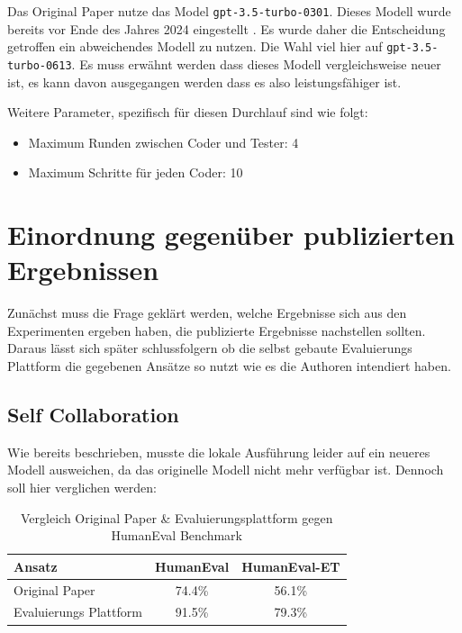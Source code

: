 Das Original Paper nutze das Model \texttt{gpt-3.5-turbo-0301}. Dieses Modell wurde bereits vor Ende des Jahres 2024 eingestellt \cite{DeprecationsOpenAIAPI}. Es wurde daher die Entscheidung getroffen ein abweichendes Modell zu nutzen. Die Wahl viel hier auf \texttt{gpt-3.5-turbo-0613}. Es muss erwähnt werden dass dieses Modell vergleichsweise neuer ist, es kann davon ausgegangen werden dass es also leistungsfähiger ist.

Weitere Parameter, spezifisch für diesen Durchlauf sind wie folgt:

\begin{itemize}
    \item Maximum Runden zwischen Coder und Tester: 4
    \item Maximum Schritte für jeden Coder: 10
\end{itemize}

\section{Einordnung gegenüber publizierten Ergebnissen}\label{Einordnung gegenüber publizierten Ergebnissen}

Zunächst muss die Frage geklärt werden, welche Ergebnisse sich aus den Experimenten ergeben haben, die publizierte Ergebnisse nachstellen sollten. Daraus lässt sich später schlussfolgern ob die selbst gebaute Evaluierungs Plattform die gegebenen Ansätze so nutzt wie es die Authoren intendiert haben.

\subsection{Self Collaboration}

Wie bereits beschrieben, musste die lokale Ausführung leider auf ein neueres Modell ausweichen, da das originelle Modell nicht mehr verfügbar ist. Dennoch soll hier verglichen werden:

\begin{table}[H]
    \centering
    \caption{Vergleich Original Paper \& Evaluierungsplattform gegen HumanEval Benchmark}
    \label{tab:humaneval_comparison}
    \begin{tabular}{@{}lcc@{}}
        \toprule
        Ansatz & HumanEval & HumanEval-ET \\
        \midrule
        Original Paper & 74.4\% & 56.1\% \\
        Evaluierungs Plattform & 91.5\% & 79.3\% \\
        \bottomrule
    \end{tabular}
\end{table}

